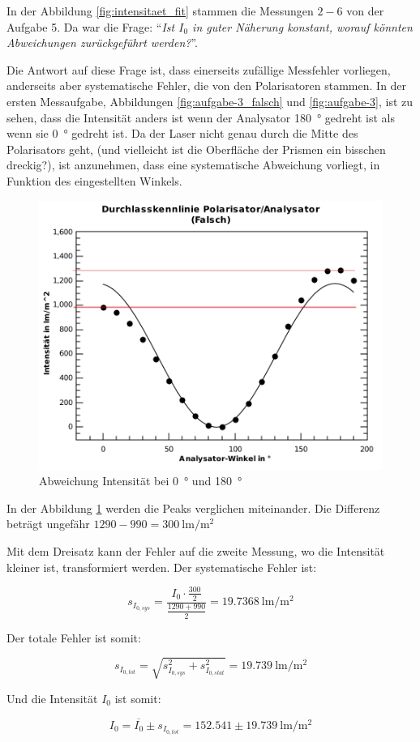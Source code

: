 In der Abbildung \ref{fig:intensitaet_fit} stammen die  Messungen  $2-6$ von der
Aufgabe 5. Da war  die  Frage: ``\textit{Ist $I_0$ in guter N\"aherung konstant,
worauf k\"onnten Abweichungen zur\"uckgef\"uhrt werden?}''.

Die  Antwort  auf  diese  Frage  ist,  dass  einerseits  zuf\"allige  Messfehler
vorliegen,  anderseits  aber  systematische  Fehler,  die  von den Polarisatoren
stammen. In der ersten Messaufgabe,  Abbildungen  \ref{fig:aufgabe-3_falsch} und
\ref{fig:aufgabe-3}, ist  zu  sehen,  dass  die Intensit\"at anders ist wenn der
Analysator \SI{180}{\degree} gedreht ist als wenn  sie  \SI{0}{\degree}  gedreht
ist. Da der Laser  nicht  genau  durch  die  Mitte  des  Polarisators geht, (und
vielleicht  ist  die  Oberfl\"ache  der  Prismen  ein  bisschen  dreckig?),  ist
anzunehmen,  dass  eine  systematische  Abweichung  vorliegt,  in  Funktion  des
eingestellten Winkels.

\begin{figure}[H]
    \centering
    \includegraphics[width=.5\linewidth]{images/intensitaet_sys.pdf}
    \caption{Abweichung Intensit\"at bei \SI{0}{\degree} und \SI{180}{\degree}}
    \label{fig:intensitaet_sys}
\end{figure}

In  der  Abbildung  \ref{fig:intensitaet_sys}   werden   die   Peaks  verglichen
miteinander.         Die         Differenz          betr\"agt         ungef\"ahr
$1290-990=\SI{300}{\lumen\per\square\meter}$

Mit dem Dreisatz  kann  der  Fehler  auf die zweite Messung, wo die Intensit\"at
kleiner    ist,    transformiert   werden.   Der   systematische   Fehler   ist:

\begin{equation}
    s_{I_{0,sys}} = \frac{I_0\cdot\frac{300}{2}}{\frac{1290+990}{2}} = \SI{19.7368}{\lumen\per\square\meter}
\end{equation}

Der totale Fehler ist somit:

\begin{equation}
    s_{I_{0,tot}} = \sqrt{s_{I_{0,sys}}^2 + s_{I_{0,stat}}^2} = \SI{19.739}{\lumen\per\square\meter}
\end{equation}

Und die Intensit\"at $I_0$ ist somit:

\begin{equation}
    I_0 = \overline{I_0} \pm s_{I_{0,tot}} = 152.541 \pm 19.739\SI{}{\lumen\per\square\meter}
\end{equation}

